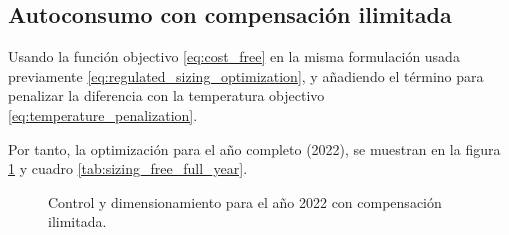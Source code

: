 \clearpage
\subsection{Autoconsumo con compensación ilimitada}

Usando la función objectivo \eqref{eq:cost_free} en la misma formulación usada
previamente \eqref{eq:regulated_sizing_optimization}, y añadiendo el término
para penalizar la diferencia con la temperatura objectivo
\eqref{eq:temperature_penalization}.

Por tanto, la optimización para el año completo (2022), se muestran en la
figura \ref{fig:sizing_free_full_year} y cuadro \ref{tab:sizing_free_full_year}.

\begin{figure}[h] \centering
	\centering
	
	\caption{Control y dimensionamiento para el año 2022 con compensación ilimitada.}
	\label{fig:sizing_free_full_year}
\end{figure}

